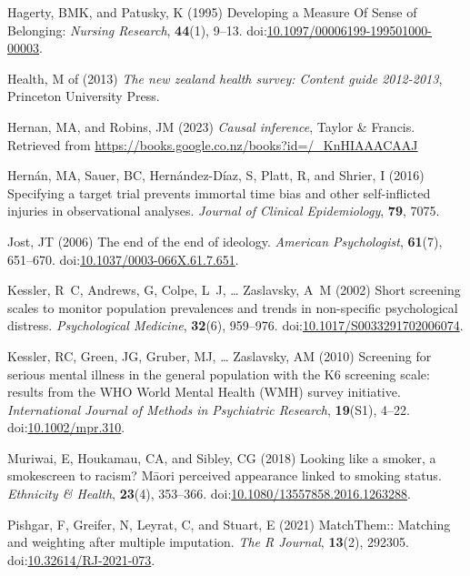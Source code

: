 \documentclass[
  singlecolumn,
  9pt]{scrartcl}
\newlength{\cslhangindent}
\newenvironment{CSLReferences}[2] %
 {\begin{list}{}{%
  \setlength{\itemindent}{0pt}
  \setlength{\leftmargin}{0pt}
  \setlength{\parsep}{0pt}
  \ifodd #1
   \setlength{\leftmargin}{\cslhangindent}
   \setlength{\itemindent}{-1\cslhangindent}
  \fi
  \setlength{\itemsep}{#2\baselineskip}}}
 {\end{list}}
\begin{document}
\begin{CSLReferences}{1}{0}
Hagerty, BMK, and Patusky, K (1995) Developing a Measure Of Sense of
Belonging: \emph{Nursing Research}, \textbf{44}(1), 9--13.
doi:\href{https://doi.org/10.1097/00006199-199501000-00003}{10.1097/00006199-199501000-00003}.

Health, M of (2013) \emph{The new zealand health survey: Content guide
2012-2013}, Princeton University Press.

Hernan, MA, and Robins, JM (2023) \emph{Causal inference}, Taylor \&
Francis. Retrieved from
\url{https://books.google.co.nz/books?id=/_KnHIAAACAAJ}

Hernán, MA, Sauer, BC, Hernández-Díaz, S, Platt, R, and Shrier, I (2016)
Specifying a target trial prevents immortal time bias and other
self-inflicted injuries in observational analyses. \emph{Journal of
Clinical Epidemiology}, \textbf{79}, 7075.

Jost, JT (2006) The end of the end of ideology. \emph{American
Psychologist}, \textbf{61}(7), 651--670.
doi:\href{https://doi.org/10.1037/0003-066X.61.7.651}{10.1037/0003-066X.61.7.651}.

Kessler, R~C, Andrews, G, Colpe, L~J, \ldots{} Zaslavsky, A~M (2002)
Short screening scales to monitor population prevalences and trends in
non-specific psychological distress. \emph{Psychological Medicine},
\textbf{32}(6), 959--976.
doi:\href{https://doi.org/10.1017/S0033291702006074}{10.1017/S0033291702006074}.

Kessler, RC, Green, JG, Gruber, MJ, \ldots{} Zaslavsky, AM (2010)
Screening for serious mental illness in the general population with the
K6 screening scale: results from the WHO World Mental Health (WMH)
survey initiative. \emph{International Journal of Methods in Psychiatric
Research}, \textbf{19}(S1), 4--22.
doi:\href{https://doi.org/10.1002/mpr.310}{10.1002/mpr.310}.

Muriwai, E, Houkamau, CA, and Sibley, CG (2018) Looking like a smoker, a
smokescreen to racism? Māori perceived appearance linked to smoking
status. \emph{Ethnicity \& Health}, \textbf{23}(4), 353--366.
doi:\href{https://doi.org/10.1080/13557858.2016.1263288}{10.1080/13557858.2016.1263288}.

Pishgar, F, Greifer, N, Leyrat, C, and Stuart, E (2021) MatchThem::
Matching and weighting after multiple imputation. \emph{The R Journal},
\textbf{13}(2), 292305.
doi:\href{https://doi.org/10.32614/RJ-2021-073}{10.32614/RJ-2021-073}.


\end{CSLReferences}
\end{document}
